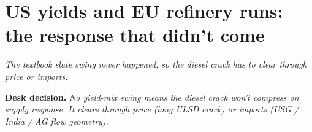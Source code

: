 \documentclass[10pt,a4paper]{article}
\begin{document}
\newpage

\section{US yields and EU refinery runs: the response that didn't come}\label{sec:8}

\textit{The textbook slate swing never happened, so the diesel crack has to clear through price or imports.}

\noindent\textcolor{obred}{\textbf{Desk decision.}} \emph{No yield-mix swing means the diesel crack won't compress on supply response. It clears through price (long ULSD crack) or imports (USG / India / AG flow geometry).}

\vspace{0.2cm}
\end{document}
